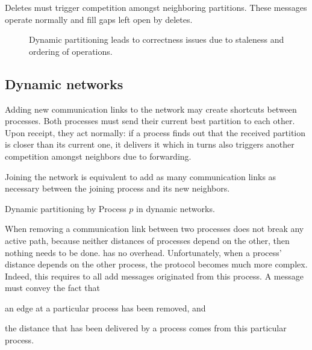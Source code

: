 \noindent Deletes must trigger competition amongst neighboring
partitions. These  messages operate normally and fill gaps
left open by deletes.

\begin{figure*}
  \begin{center}
    \hspace{10pt}
    \caption{\label{fig:proof}Dynamic partitioning leads to correctness issues due to
      staleness and ordering of operations.}
  \end{center}
\end{figure*}

\subsection{Dynamic networks}
Adding new communication links to the network may create shortcuts
between processes. Both processes must send their current best
partition to each other. Upon receipt, they act normally: if a process
finds out that the received partition is closer than its current one,
it delivers it which in turns also triggers another competition
amongst neighbors due to forwarding.

\noindent Joining the network is equivalent to add as many
communication links as necessary between the joining process and its
new neighbors.

\begin{algorithm}
  
  \caption{\label{algo:edges}Dynamic partitioning by Process $p$ in dynamic networks.}
\end{algorithm}



When removing a communication link between two processes does not
break any active path, because neither distances of processes depend
on the other, then nothing needs to be done. \NAME has no overhead.
Unfortunately, when a process' distance depends on the other process,
the protocol becomes much more complex. Indeed, this requires to
 all add messages originated from this process. A message
must convey the fact that
\begin{inparaenum}[(i)]
\item an edge at a particular process has been removed, and
\item the distance that has been delivered by a process comes from
  this particular process.
\end{inparaenum}

